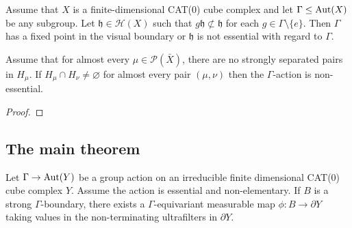 \begin{thm}
  \label{thm:cs-flipping}
  Assume that \(X\) is a finite-dimensional CAT(0) cube complex and let \(\Gamma \leq \operatorname{Aut}(X)\) be any subgroup. Let \(\mathfrak{h} \in \mathcal{H}(X)\) such that \(g\mathfrak{h} \not\subset \mathfrak{h}\) for each \(g \in \Gamma \setminus \{e\}\). Then \(\Gamma\) has a fixed point in the visual boundary or \(\mathfrak{h}\) is not essential with regard to \(\Gamma\).
\end{thm}

\begin{cor}[{\cite[Corollary~4.21]{MR3509968}}]
  \label{cor:4.21}
  Assume that for almost every \(\mu \in \mathcal{P}(\bar X)\), there are no strongly separated pairs in \(H_\mu\). If \(H_\mu \cap H_\nu \neq \varnothing\) for almost every pair \((\mu, \nu)\) then the \(\Gamma\)-action is non-essential.
\end{cor}

\begin{proof}
  
\end{proof}

\subsection{The main theorem}
\label{sec:main-proof}

\begin{thm}[{\cite[Theorem~4.1]{MR3509968}}]
  \label{thm:4.1}
  Let \(\Gamma \to \operatorname{Aut}(Y)\) be a group action on an irreducible finite dimensional CAT(0) cube complex \(Y\). Assume the action is essential and non-elementary. If \(B\) is a strong \(\Gamma\)-boundary, there exists a \(\Gamma\)-equivariant measurable map \(\phi\colon B \to \partial Y\) taking values in the non-terminating ultrafilters in \(\partial Y\).
\end{thm}

